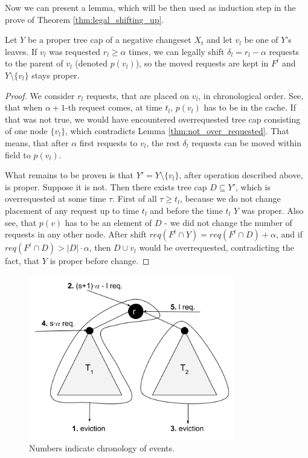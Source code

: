 Now we can present a lemma, which will be then used as induction step in the
prove of Theorem \ref{thm:legal_shifting_up}.
\begin{lemma} Let $Y$ be a proper
tree cap of a negative changeset $X_t$ and let $v_l$ be one of $Y$'s leaves. If
$v_l$ was requested $r_l \geq \alpha$ times, we can legally shift  $\delta_l =
r_l - \alpha$ requests to the parent of $v_l$ (denoted $p(v_l)$), so the moved
requests are kept in $F^t$ and $Y \setminus \{v_l\}$ stays proper.
\end{lemma}
\begin{proof}
We consider $r_l$ requests, that are placed on $v_l$, in
chronological order.  See, that when $\alpha + 1$-th request comes, at time
$t_l$, $p(v_l)$ has to be in the cache. If that was not true, we would have
encountered overrequested tree cap consisting of one node $\{v_l\}$, which
contradicts Lemma \ref{thm:not_over_requested}. That means, that after $\alpha$
first requests to $v_l$, the rest $\delta_l$ requests can be moved within field
to $p(v_l)$.

What remains to be proven is that $Y' = Y \setminus \{v_l\}$, after operation
described above, is proper. Suppose it is not. Then there exists tree cap $D
\subseteq Y'$, which is overrequested at some time $\tau$. First of all $\tau
\geq t_l$, because we do not change placement of any request up to time $t_l$
and before the time $t_l$ $Y$ was proper. Also see, that $p(v)$ has to be an
element of $D$ - we did not change the number of requests in any other node.
After shift $req(F^t \cap Y) = req(F^t \cap D) + \alpha$, and if $req(F^t \cap
D) > |D| \cdot \alpha$, then $D \cup v_l$ would be overrequested, contradicting
the fact, that $Y$ is proper before change.
\end{proof}
\begin{figure}
\begin{center} \includegraphics[width=0.8\textwidth]{example_not_even.png}
\end{center} \caption{Numbers indicate chronology of events.}
\label{fig:example_not_even} \end{figure}

